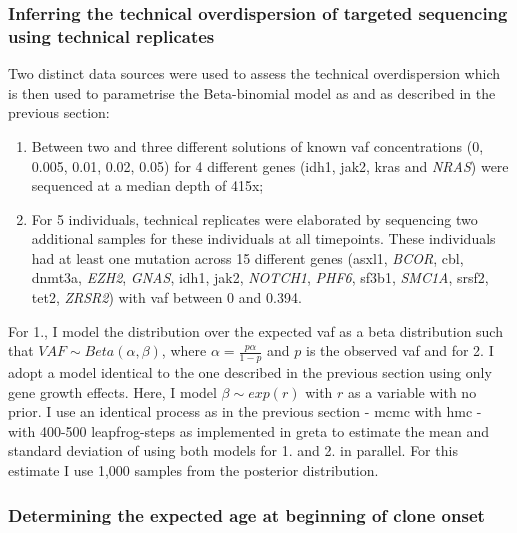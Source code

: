 \subsubsection{Inferring the technical overdispersion of targeted sequencing using technical replicates}

Two distinct data sources were used to assess the technical overdispersion which is then used to parametrise the Beta-binomial model as  and as described in the previous section:
\begin{enumerate}
    \item Between two and three different solutions of known \ac{vaf} concentrations (0, 0.005, 0.01, 0.02, 0.05) for 4 different genes (\ac{idh1}, \ac{jak2}, \ac{kras} and \textit{NRAS}) were sequenced at a median depth of 415x;
    \item For 5 individuals, technical replicates were elaborated by sequencing two additional samples for these individuals at all timepoints. These individuals had at least one mutation across 15 different genes (\ac{asxl1}, \textit{BCOR}, \ac{cbl}, \ac{dnmt3a}, \textit{EZH2}, \textit{GNAS}, \ac{idh1}, \ac{jak2}, \textit{NOTCH1}, \textit{PHF6}, \ac{sf3b1}, \textit{SMC1A}, \ac{srsf2}, \ac{tet2}, \textit{ZRSR2}) with \ac{vaf} between 0 and 0.394. 
\end{enumerate}

For 1., I model the distribution over the expected \ac{vaf} as a beta distribution such that $VAF \sim Beta(\alpha,\beta)$, where $\alpha=\frac{p\alpha}{1-p}$ and $p$ is the observed \ac{vaf} and for 2. I adopt a model identical to the one described in the previous section using only gene growth effects. Here, I model $\beta \sim exp(r)$ with $r$ as a variable with no prior. I use an identical process as in the previous section - \ac{mcmc} with \ac{hmc} - with 400-500 leapfrog-steps as implemented in greta \cite{Golding2019-wh} to estimate the mean and standard deviation of  using both models for 1. and 2. in parallel. For this estimate I use 1,000 samples from the posterior distribution.

\subsubsection{Determining the expected age at beginning of clone onset}

